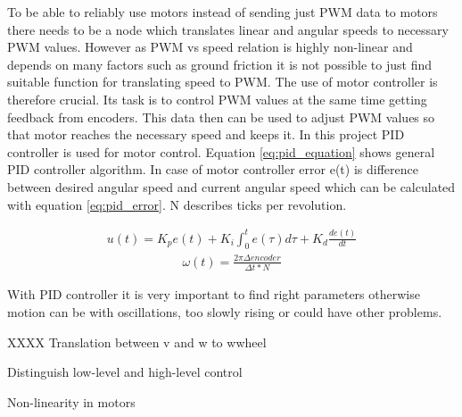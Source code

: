 To be able to reliably use motors instead of sending just PWM data to motors there needs to be a node which translates linear and angular speeds to necessary PWM values. However as PWM vs speed relation is highly non-linear and depends on many factors such as ground friction it is not possible to just find suitable function for translating speed to PWM. The use of motor controller is therefore crucial. Its task is to control PWM values at the same time getting feedback from encoders. This data then can be used to adjust PWM values so that motor reaches the necessary speed and keeps it. In this project PID controller is used for motor control. Equation \ref{eq:pid_equation} shows general PID controller algorithm. In case of motor controller error e(t) is difference between desired angular speed and current angular speed which can be calculated with equation \ref{eq:pid_error}. N describes ticks per revolution.

\begin{align}
\label{eq:pid_equation}
u(t) = K_p e(t) + K_i \int_{0}^{t} e(\tau) d\tau + K_d \frac{de(t)}{dt} 
\end{align}
\begin{align}
\label{eq:pid_error}
\omega (t) = \frac{2 \pi \Delta encoder}{\Delta t * N}
\end{align}

With PID controller it is very important to find right parameters otherwise motion can be with oscillations, too slowly rising or could have other problems. 

XXXX Translation between v and w to wwheel

Distinguish low-level and high-level control

Non-linearity in motors